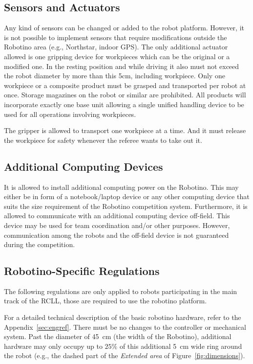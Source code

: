 \documentclass[12pt,twoside]{article}
\newcommand{\Robotino}{Robotino}
\newcommand{\reffig}[1]{Figure~\ref{#1}}
\begin{document}
\subsection{Sensors and Actuators}
Any kind of sensors can be changed or added to the robot platform.
However, it is not possible to implement sensors that require
modifications outside the Robotino area (e.g., Northstar, indoor GPS).
The only additional actuator allowed is one gripping device for
workpieces which can be the original or a modified one. In the resting
position and while driving it also must not exceed the robot diameter by
more than this 5cm, including workpiece.
Only one workpiece or a composite product must be grasped and
transported per robot at once. Storage magazines on the robot or
similar are prohibited. All products will incorporate exactly one base
unit allowing a single unified handling device to be used for all
operations involving workpieces.

The gripper is allowed to transport one workpiece at a time. And it must
release the workpiece for safety whenever the referee wants to take out it.

\subsection{Additional Computing Devices}
It is allowed to install additional computing power on the
\Robotino. This may either be in form of a notebook/laptop device or
any other computing device that suits the size requirement of the
\Robotino{} competition system. Furthermore, it is allowed to
communicate with an additional computing device off-field. This device
may be used for team coordination and/or other purposes. However,
communication among the robots and the off-field device is not
guaranteed during the competition.

\subsection{Robotino-Specific Regulations}
The following regulations are only applied to robots participating in the
main track of the \ac{RCLL}, those are required to use the robotino platform.

For a detailed technical description of the
basic robotino hardware, refer to the Appendix~\ref{sec:engref}.
There must be no changes to the controller or mechanical system.
Past the diameter of \SI{45}{\centi\metre} (the width of the Robotino),
additional hardware may only occupy up to $25\%$ of this
additional \SI{5}{\centi\metre} wide ring around the robot
(e.g., the dashed part of the \emph{Extended area} of \reffig{fig:dimensions}).
\end{document}
